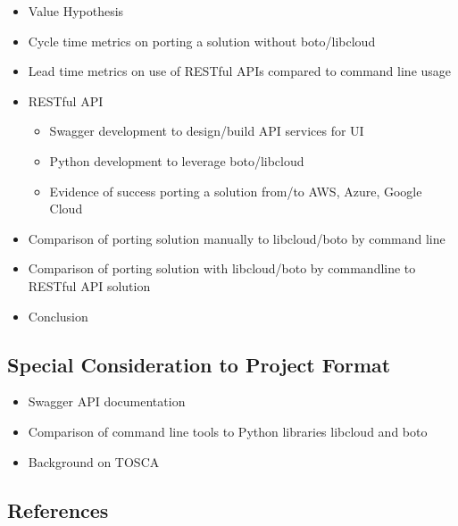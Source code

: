 \begin{itemize}
\item
  Value Hypothesis
\item
  Cycle time metrics on porting a solution without boto/libcloud
\item
  Lead time metrics on use of RESTful APIs compared to command line
  usage
\item
  RESTful API

  \begin{itemize}
    \item
    Swagger development to design/build API services for UI
  \item
    Python development to leverage boto/libcloud
  \item
    Evidence of success porting a solution from/to AWS, Azure, Google
    Cloud
  \end{itemize}
\item
  Comparison of porting solution manually to libcloud/boto by command
  line
\item
  Comparison of porting solution with libcloud/boto by commandline to
  RESTful API solution
\item
  Conclusion
\end{itemize}

\hypertarget{special-consideration-to-project-format}{%
\subsection{Special Consideration to Project
Format}\label{special-consideration-to-project-format}}

\begin{itemize}
\item
  Swagger API documentation
\item
  Comparison of command line tools to Python libraries libcloud and boto
\item
  Background on TOSCA
\end{itemize}

\subsection{References}\label{references}

